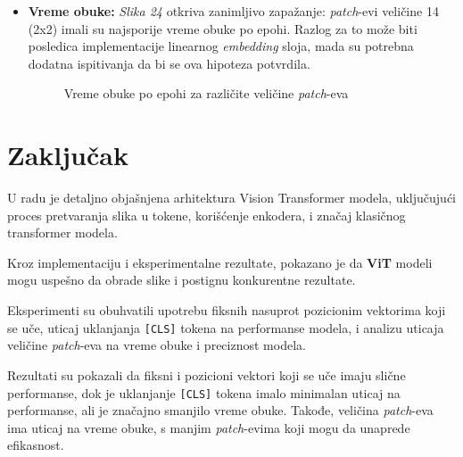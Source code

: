 \documentclass[12pt]{article}
\begin{document}
\begin{itemize}
      \newpage
      \item \textbf{Vreme obuke:} \textit{Slika 24} otkriva zanimljivo zapažanje: 
      \textit{patch}-evi veličine 14 (2x2) imali su najsporije vreme obuke po epohi. 
      Razlog za to može biti posledica implementacije linearnog \textit{embedding} sloja, 
      mada su potrebna dodatna ispitivanja da bi se ova hipoteza potvrdila.
      \begin{figure}[h!]
         \centering
         \caption{Vreme obuke po epohi za različite veličine \textit{patch}-eva}
         \label{fig:exp3_time}
      \end{figure}
   \end{itemize}
   \newpage
   \section{Zaključak}

   U radu je detaljno objašnjena arhitektura Vision Transformer modela, uključujući 
   proces pretvaranja slika u tokene, korišćenje enkodera, i značaj klasičnog 
   transformer modela.

   Kroz implementaciju i eksperimentalne rezultate, pokazano je da \textbf{ViT} modeli 
   mogu uspešno da obrade slike i postignu konkurentne rezultate.

   Eksperimenti su obuhvatili upotrebu fiksnih nasuprot pozicionim vektorima koji se uče, 
   uticaj uklanjanja \texttt{[CLS]} tokena na performanse modela, i analizu uticaja 
   veličine \textit{patch}-eva na vreme obuke i preciznost modela.

   Rezultati su pokazali da fiksni i pozicioni vektori koji se uče imaju slične 
   performanse, dok je uklanjanje \texttt{[CLS]} tokena imalo minimalan uticaj na 
   performanse, ali je značajno smanjilo vreme obuke. Takođe, veličina \textit{patch}-eva 
   ima uticaj na vreme obuke, s manjim \textit{patch}-evima koji mogu da 
   unaprede efikasnost.

   \newpage
   \printbibliography[title={Literatura}]
\end{document}
